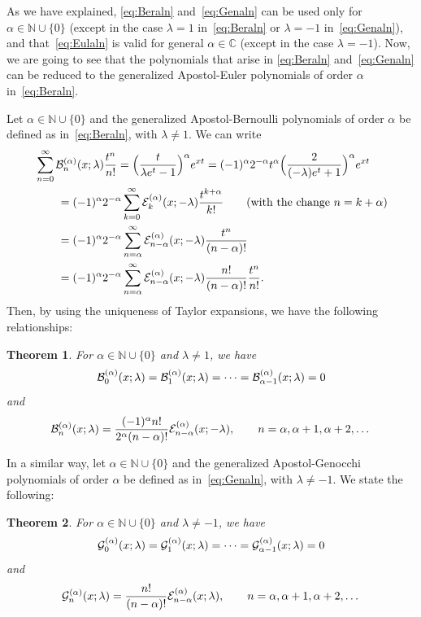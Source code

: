 \documentclass[11pt,a4paper]{amsart}
\newcommand{\N}{\mathbb{N}}
\newcommand{\C}{\mathbb{C}}
\newcommand{\B}[1][]{\mathcal{B}\ifx#1\empty\else^{(#1)}\fi}
\newcommand{\E}[1][]{\mathcal{E}\ifx#1\empty\else^{(#1)}\fi}
\newcommand{\G}[1][]{\mathcal{G}\ifx#1\empty\else^{(#1)}\fi}
\theoremstyle{plain}
\newtheorem{theor}{Theorem}
\theoremstyle{plain}
\theoremstyle{plain}
\begin{document}
As we have explained, \eqref{eq:Beraln} and~\eqref{eq:Genaln} can be used only for $\alpha \in \N \cup \{0\}$ (except in the case $\lambda=1$ in~\eqref{eq:Beraln} or $\lambda=-1$ in~\eqref{eq:Genaln}), and that~\eqref{eq:Eulaln} is valid for general $\alpha \in \C$ (except in the case $\lambda=-1$). Now, we are going to see that the polynomials that arise in \eqref{eq:Beraln} and~\eqref{eq:Genaln} can be reduced to the generalized Apostol-Euler polynomials of order $\alpha$ in~\eqref{eq:Beraln}.


Let $\alpha \in \N \cup \{0\}$ and the generalized Apostol-Bernoulli polynomials of order $\alpha$ be defined as in~\eqref{eq:Beraln}, with $\lambda \ne 1$. 
We can write
\begin{align*}
  &\sum_{n=0}^{\infty} \B[\alpha]_{n}(x;\lambda) \frac{t^n}{n!}
  = \Big( \frac{t}{\lambda e^t-1} \Big)^\alpha e^{xt} 
  = (-1)^\alpha 2^{-\alpha} t^\alpha \Big( \frac{2}{(-\lambda) e^t+1} \Big)^\alpha e^{xt} \\
  &\qquad = (-1)^\alpha 2^{-\alpha} \sum_{k=0}^{\infty} \E[\alpha]_{k}(x;-\lambda) \frac{t^{k+\alpha}}{k!} 
  \qquad\text{(with the change $n=k+\alpha$)} \\
  &\qquad = (-1)^\alpha 2^{-\alpha} \sum_{n=\alpha}^{\infty} \E[\alpha]_{n-\alpha}(x;-\lambda) \frac{t^{n}}{(n-\alpha)!} \\
  &\qquad = (-1)^\alpha 2^{-\alpha} \sum_{n=\alpha}^{\infty} \E[\alpha]_{n-\alpha}(x;-\lambda) \frac{n!}{(n-\alpha)!} \frac{t^{n}}{n!}.
\end{align*}
Then, by using the uniqueness of Taylor expansions, we have the following relationships:

\begin{theor}
For $\alpha \in \N \cup \{0\}$ and $\lambda \ne 1$, we have
\[
  \B[\alpha]_{0}(x;\lambda) = \B[\alpha]_{1}(x;\lambda) = \cdots = \B[\alpha]_{\alpha-1}(x;\lambda) = 0
\]
and
\begin{equation}
\label{eq:BtoE}
  \B[\alpha]_{n}(x;\lambda) = \frac{(-1)^\alpha n!}{2^\alpha (n-\alpha)!} \E[\alpha]_{n-\alpha}(x;-\lambda),
  \qquad n = \alpha, \alpha+1, \alpha+2, \dots
\end{equation}
\end{theor}

In a similar way, let $\alpha \in \N \cup \{0\}$ and the generalized Apostol-Genocchi polynomials of order $\alpha$ be defined as in~\eqref{eq:Genaln}, with $\lambda \ne -1$. 
We state the following:

\begin{theor}
For $\alpha \in \N \cup \{0\}$ and $\lambda \ne -1$, we have
\[
  \G[\alpha]_{0}(x;\lambda) = \G[\alpha]_{1}(x;\lambda) = \cdots = \G[\alpha]_{\alpha-1}(x;\lambda) = 0
\]
and
\begin{equation}
\label{eq:GtoE}
  \G[\alpha]_{n}(x;\lambda) = \frac{n!}{(n-\alpha)!} \E[\alpha]_{n-\alpha}(x;\lambda),
  \qquad n = \alpha, \alpha+1, \alpha+2, \dots
\end{equation}
\end{theor}
\end{document}

